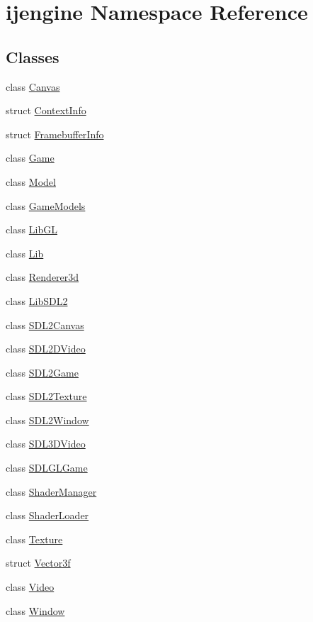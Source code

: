 \hypertarget{namespaceijengine}{\section{ijengine Namespace Reference}
\label{namespaceijengine}
}
\subsection*{Classes}
\begin{DoxyCompactItemize}
\item 
class \hyperlink{classijengine_1_1Canvas}{Canvas}
\item 
struct \hyperlink{structijengine_1_1ContextInfo}{Context\-Info}
\item 
struct \hyperlink{structijengine_1_1FramebufferInfo}{Framebuffer\-Info}
\item 
class \hyperlink{classijengine_1_1Game}{Game}
\item 
class \hyperlink{structijengine_1_1Model}{Model}
\item 
class \hyperlink{classijengine_1_1GameModels}{Game\-Models}
\item 
class \hyperlink{classijengine_1_1LibGL}{Lib\-G\-L}
\item 
class \hyperlink{classijengine_1_1Lib}{Lib}
\item 
class \hyperlink{classijengine_1_1Renderer3d}{Renderer3d}
\item 
class \hyperlink{classijengine_1_1LibSDL2}{Lib\-S\-D\-L2}
\item 
class \hyperlink{classijengine_1_1SDL2Canvas}{S\-D\-L2\-Canvas}
\item 
class \hyperlink{classijengine_1_1SDL2DVideo}{S\-D\-L2\-D\-Video}
\item 
class \hyperlink{classijengine_1_1SDL2Game}{S\-D\-L2\-Game}
\item 
class \hyperlink{classijengine_1_1SDL2Texture}{S\-D\-L2\-Texture}
\item 
class \hyperlink{classijengine_1_1SDL2Window}{S\-D\-L2\-Window}
\item 
class \hyperlink{classijengine_1_1SDL3DVideo}{S\-D\-L3\-D\-Video}
\item 
class \hyperlink{classijengine_1_1SDLGLGame}{S\-D\-L\-G\-L\-Game}
\item 
class \hyperlink{classijengine_1_1ShaderManager}{Shader\-Manager}
\item 
class \hyperlink{classijengine_1_1ShaderLoader}{Shader\-Loader}
\item 
class \hyperlink{classijengine_1_1Texture}{Texture}
\item 
struct \hyperlink{structijengine_1_1Vector3f}{Vector3f}
\item 
class \hyperlink{classijengine_1_1Video}{Video}
\item 
class \hyperlink{classijengine_1_1Window}{Window}
\end{DoxyCompactItemize}
